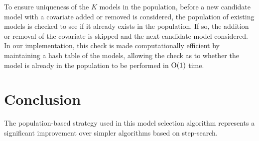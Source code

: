 To ensure uniqueness of the $K$ models in the population, before a new candidate model with a covariate added
or removed is considered, the population of existing models is checked to see if it already exists in the
population. If so, the addition or removal of the covariate is skipped and the next candidate model considered.
In our implementation, this check is made computationally efficient by maintaining a hash table of the models,
allowing the check as to whether the model is already in the population to be performed in $\text{O}(1)$ time.

\section{Conclusion}
The population-based strategy used in this model selection algorithm represents a significant improvement over
simpler algorithms based on step-search.
